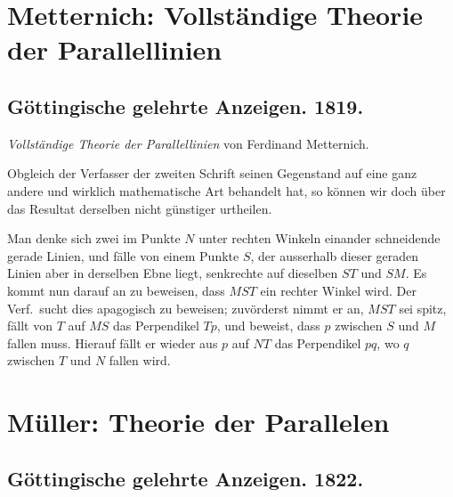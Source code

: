 \documentclass[fontsize=10pt,paper=a5,pagesize,headings=small,headinclude=true,footinclude=true]{scrbook}
\begin{document}
\newpage
\section*{Metternich: Vollständige Theorie der Parallellinien}

\subsection*{Göttingische gelehrte Anzeigen. 1819.}

\textit{Vollständige Theorie der Parallellinien} von Ferdinand Metternich.

Obgleich der Verfasser der zweiten Schrift seinen Gegenstand auf eine ganz andere und wirklich mathematische Art behandelt hat, so können wir doch über das Resultat derselben nicht günstiger urtheilen.

Man denke sich zwei im Punkte $N$ unter rechten Winkeln einander schneidende gerade Linien, und fälle von einem Punkte $S$, der ausserhalb dieser geraden Linien aber in derselben Ebne liegt, senkrechte auf dieselben $ST$ und $SM$. Es kommt nun darauf an zu beweisen, dass $MS T$ ein rechter Winkel wird. Der Verf.~sucht dies apagogisch zu beweisen; zuvörderst nimmt er an, $MST$ sei spitz, fällt von $T$ auf $MS$ das Perpendikel $Tp$, und beweist, dass $p$ zwischen $S$ und $M$ fallen muss. Hierauf fällt er wieder aus $p$ auf $NT$ das Perpendikel $pq$, wo $q$ zwischen $T$ und $N$ fallen wird.

\newpage
\section*{Müller: Theorie der Parallelen}

\subsection*{Göttingische gelehrte Anzeigen. 1822.}
\end{document}
